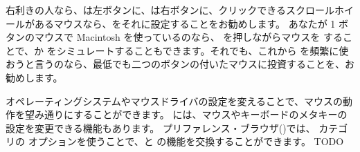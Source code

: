 \documentclass[a4paper,10pt,twoside]{book}
\begin{document}





右利きの人なら、\click は左ボタンに、\actclick は右ボタンに、クリックできるスクロールホイールがあるマウスなら、\metaclick をそれに設定することをお勧めします。
あなたが 1 ボタンのマウスで Macintosh を使っているのなら、\clover{} を押しながらマウスを \click することで、\actclick か \metaclick をシミュレートすることもできます。それでも、これから \pharo を頻繁に使おうと言うのなら、最低でも二つのボタンの付いたマウスに投資することを、お勧めします。

オペレーティングシステムやマウスドライバの設定を変えることで、マウスの動作を望み通りにすることができます。
\pharo には、マウスやキーボードのメタキーの設定を変更できる機能もあります。
プリファレンス・ブラウザ()では、 カテゴリの  オプションを使うことで、\actclick と \metaclick の機能を交換することができます。
TODO
\end{document}
